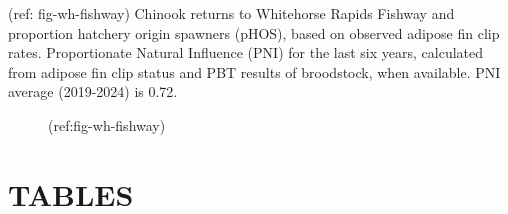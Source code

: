 \documentclass[11pt]{book}
\begin{document}
(ref: fig-wh-fishway) Chinook returns to Whitehorse Rapids Fishway and proportion hatchery origin spawners (pHOS), based on observed adipose fin clip rates. Proportionate Natural Influence (PNI) for the last six years, calculated from adipose fin clip status and PBT results of broodstock, when available. PNI average (2019-2024) is 0.72.\,
\begin{figure}[htb]

{\centering {} 

}

\caption{(ref:fig-wh-fishway)}\label{fig:fig-wh-fishway}
\end{figure}
\clearpage

\hypertarget{tables}{%
\section{TABLES}\label{tables}}
\end{document}
